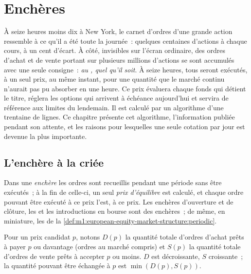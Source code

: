 \chapter{Enchères}\label{ch:m1:auctions}

À seize heures moins dix à New York, le carnet d'ordres d'une grande action ressemble à ce qu'il
a été toute la journée~: quelques centaines d'actions à chaque cours, à un cent d'écart. À côté,
invisibles sur l'écran ordinaire, des ordres d'achat et de vente portant sur plusieurs millions
d'actions se sont accumulés avec une seule consigne~: \emph{au , quel qu'il soit}. À seize
heures, tous seront exécutés, à un seul prix, au même instant, pour une quantité que le marché continu
n'aurait pas pu absorber en une heure. Ce prix évaluera chaque fonds qui détient le titre, réglera
les options qui arrivent à échéance aujourd'hui et servira de référence aux limites du lendemain.
Il est calculé par un algorithme d'une trentaine de lignes.
Ce chapitre présente cet algorithme, l'information publiée pendant son attente,
et les raisons pour lesquelles une seule cotation par jour
est devenue la plus importante.

\section{L'enchère à la criée}

\begin{definition}\label{def:m1:auctions:call}
Dans une \emph{enchère} les ordres sont recueillis pendant une période
sans être exécutés~; à la fin de celle-ci, un seul
\emph{prix d'équilibre} est calculé, et chaque ordre pouvant être exécuté
à ce prix l'est, à ce prix. Les enchères d'ouverture et de clôture, les 
et les introductions en bourse sont des enchères~; de même, en miniature,
les  de la
\cref{def:m1:european-equity-market-structure:periodic}.
\end{definition}

Pour un prix candidat $p$, notons $D(p)$ la quantité totale d'ordres d'achat
prêts à payer $p$ ou davantage (ordres au marché compris) et $S(p)$ la quantité totale
d'ordres de vente prêts à accepter $p$ ou moins. $D$ est décroissante, $S$ croissante~;
la quantité pouvant être échangée à $p$ est $\min(D(p), S(p))$.

